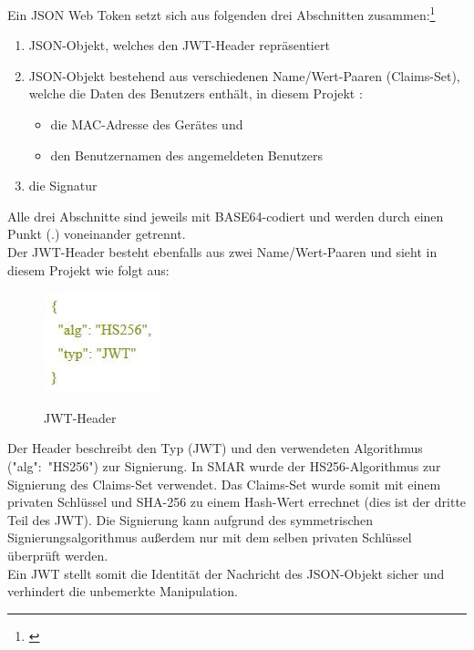 Ein \ac{JSON} Web Token setzt sich aus folgenden drei Abschnitten zusammen:\footnote{\citep[S. 289f.]{book_jwt}}
\begin{enumerate}
	\item \acs{JSON}-Objekt, welches den \acs{JWT}-Header repräsentiert
	\item \acs{JSON}-Objekt bestehend aus verschiedenen Name/Wert-Paaren (Claims-Set), welche die Daten des Benutzers enthält, in diesem Projekt \zB:
	\begin{itemize}
		\item die \acs{MAC}-Adresse des Gerätes und
		\item den Benutzernamen des angemeldeten Benutzers
	\end{itemize}
	\item die Signatur
\end{enumerate}
Alle drei Abschnitte sind jeweils mit BASE64-codiert und werden durch einen Punkt (.) voneinander getrennt.\\

Der \acs{JWT}-Header besteht ebenfalls aus zwei Name/Wert-Paaren und sieht in diesem Projekt wie folgt aus:
\begin{figure}[H]
	\centering
	{\includegraphics[scale=1.0]{Bilder/jwt_header.jpg}}
	\caption{\acs{JWT}-Header}
	\label{fig:jwt_header}
\end{figure}
Der Header beschreibt den Typ (\acs{JWT}) und den verwendeten Algorithmus  ("alg":\ "HS256")  zur Signierung. In \ac{SMAR} wurde der HS256-Algorithmus zur Signierung des Claims-Set verwendet. Das Claims-Set wurde somit mit einem privaten Schlüssel und SHA-256 zu einem Hash-Wert errechnet (dies ist der dritte Teil des \acs{JWT}). Die Signierung kann aufgrund des symmetrischen Signierungsalgorithmus außerdem nur mit dem selben privaten Schlüssel überprüft werden.\\
Ein \acl{JWT} stellt somit die Identität der Nachricht \bzw des \acs{JSON}-Objekt sicher und verhindert die unbemerkte Manipulation.\\

